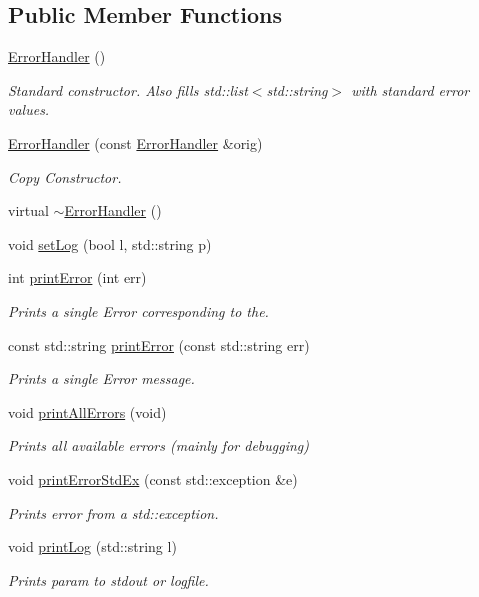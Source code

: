 \subsection*{Public Member Functions}
\begin{DoxyCompactItemize}
\item 
\mbox{\hyperlink{classErrorHandler_a7e5f379bd231442b898cef94556b2107}{Error\+Handler}} ()
\begin{DoxyCompactList}\small\item\em Standard constructor. Also fills std\+::list$<$std\+::string$>$ with standard error values. \end{DoxyCompactList}\item 
\mbox{\hyperlink{classErrorHandler_add20b373ee276ee2ef040f6dd913a86b}{Error\+Handler}} (const \mbox{\hyperlink{classErrorHandler}{Error\+Handler}} \&orig)
\begin{DoxyCompactList}\small\item\em Copy Constructor. \end{DoxyCompactList}\item 
virtual \mbox{\hyperlink{classErrorHandler_a73c7e690b864697e507aaeb537b3c3e5}{$\sim$\+Error\+Handler}} ()
\item 
void \mbox{\hyperlink{classErrorHandler_aa79cfd994939c238b85ad021ea6bbe05}{set\+Log}} (bool l, std\+::string p)
\item 
int \mbox{\hyperlink{classErrorHandler_ab90b8248f24e3129df69d224585956dd}{print\+Error}} (int err)
\begin{DoxyCompactList}\small\item\em Prints a single Error corresponding to the. \end{DoxyCompactList}\item 
const std\+::string \mbox{\hyperlink{classErrorHandler_ad1e6aa8018e2a22460a1431e6e7d8804}{print\+Error}} (const std\+::string err)
\begin{DoxyCompactList}\small\item\em Prints a single Error message. \end{DoxyCompactList}\item 
void \mbox{\hyperlink{classErrorHandler_a1108324c221544c928a2de3a2cf9ba98}{print\+All\+Errors}} (void)
\begin{DoxyCompactList}\small\item\em Prints all available errors (mainly for debugging) \end{DoxyCompactList}\item 
void \mbox{\hyperlink{classErrorHandler_ac36e4dd6e488718e7e07b2d03adf9f37}{print\+Error\+Std\+Ex}} (const std\+::exception \&e)
\begin{DoxyCompactList}\small\item\em Prints error from a std\+::exception. \end{DoxyCompactList}\item 
void \mbox{\hyperlink{classErrorHandler_a5ef18327a559b8d77be496dad6a2bf52}{print\+Log}} (std\+::string l)
\begin{DoxyCompactList}\small\item\em Prints param to stdout or logfile. \end{DoxyCompactList}\end{DoxyCompactItemize}
